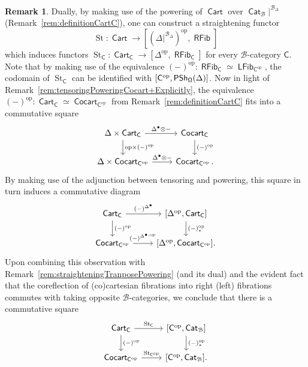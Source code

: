 \documentclass[reqno]{amsart}
\numberwithin{equation}{subsection}
\theoremstyle{plain}
\theoremstyle{definition}
\newtheorem{remark}[equation]{Remark}
\let\scr=\mathcal
\def\BB{\scr B}
\DeclareMathOperator{\IPSh}{\mathsf{PSh}}
\DeclareMathOperator{\ICat}{\mathsf{Cat}}
\DeclareMathOperator{\ICocart}{\mathsf{Cocart}}
\DeclareMathOperator{\ICart}{\mathsf{Cart}}
\DeclareMathOperator{\ILFib}{\mathsf{LFib}}
\DeclareMathOperator{\IRFib}{\mathsf{RFib}}
\DeclareMathOperator{\St}{St}
\newcommand{\op}{\mathrm{op}}
\newcommand{\I}[1]{\mathsf{#1}}
\newcommand{\iFun}[2]{{[#1,#2]}}
\newcommand{\Simp}[1]{#1_{\Delta}}
\begin{document}
\begin{remark}
	\label{rem:straighteningCart}
	Dually, by making use of the powering of $\ICart$ over $\ICat_{\BB}\vert^{\Simp\BB}$ (Remark~\ref{rem:definitionCartC}), one can construct a straightening functor
	\begin{equation*}
	\St\colon \ICart\to \iFun{(\Delta\vert^{\Simp\BB})^{\op}}{\IRFib}
	\end{equation*}
	which induces functors $\St_{\I{C}}\colon \ICart_{\I{C}}\to\iFun{\Delta^{\op}}{\IRFib_{\I{C}}}$ for every $\BB$-category $\I{C}$. Note that by making use of the equivalence $(-)^\op\colon\IRFib_{\I{C}}\simeq\ILFib_{\I{C}^\op}$, the codomain of $\St_{\I{C}}$ can be identified with $\iFun{\I{C}^{\op}}{\IPSh_{\Univ}(\Delta)}$.
	Now in light of Remark~\ref{rem:tensoringPoweringCocart+Explicitly}, the equivalence $(-)^\op\colon\ICart_{\I{C}}\simeq\ICocart_{\I{C}^\op}$ from Remark~\ref{rem:definitionCartC} fits into a commutative square
	\begin{equation*}
	\begin{tikzcd}
	\Delta\times\ICart_{\I{C}}\arrow[r, "\Delta^\bullet\otimes -"] \arrow[d, "\op\times (-)^\op"] & \ICocart_{\I{C}}\arrow[d, "(-)^\op"]\\
	\Delta\times\ICocart_{\I{C}^\op}\arrow[r, "\Delta^\bullet\otimes -"] & \ICocart_{\I{C}^\op}.
	\end{tikzcd}
	\end{equation*}
	By making use of the adjunction between tensoring and powering, this square in turn induces a commutative diagram
	\begin{equation*}
	\begin{tikzcd}
	\ICart_{\I{C}}\arrow[d, "(-)^\op"]\arrow[r, "(-)^{\Delta^\bullet}"] & \iFun{\Delta^{\op}}{\ICart_{\I{C}}}\arrow[d, "(-)^\op_\ast"]\\
	\ICocart_{\I{C}^\op}\arrow[r, "(-)^{\Delta^{\bullet,\op}}"] & \iFun{\Delta^{\op}}{\ICocart_{\I{C}^\op}}.
	\end{tikzcd}
	\end{equation*}
	Upon combining this observation with Remark~\ref{rem:straighteningTranposePowering} (and its dual) and the evident fact that the coreflection of (co)cartesian fibrations into right (left) fibrations commutes with taking opposite $\BB$-categories, we conclude that there is a commutative square
	\begin{equation*}
	\begin{tikzcd}
	\ICart_{\I{C}}\arrow[r, "\St_{\I{C}}"]\arrow[d, "(-)^\op"] & \iFun{\I{C}^\op}{\ICat_{\BB}}\arrow[d, "(-)^\op_\ast"]\\
	\ICocart_{\I{C}^\op}\arrow[r, "\St_{\I{C}^\op}"] & \iFun{\I{C}^{\op}}{\ICat_{\BB}}.
	\end{tikzcd}
	\end{equation*}
\end{remark}
\end{document}
